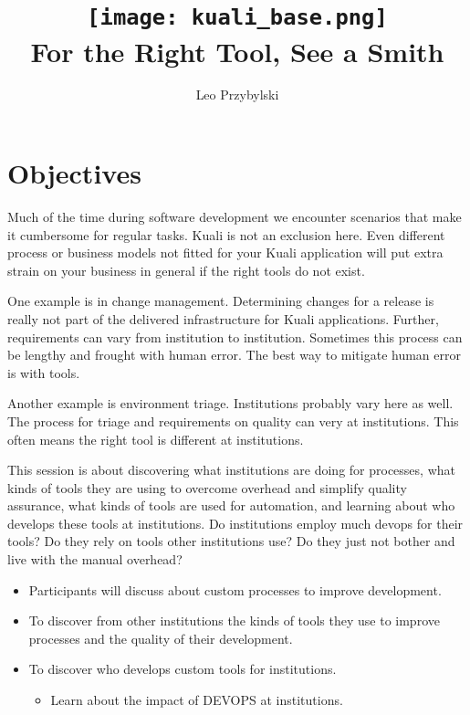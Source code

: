 \documentclass[12pt,notitlepage]{article}
\author{Leo Przybylski}
\title{\texttt{[image: kuali\_base.png]}\\For the Right Tool, See a Smith}
\date{}
\begin{document}
\maketitle
{}

\section{Objectives}

Much of the time during software development we encounter
  scenarios that make it cumbersome for regular tasks. Kuali is not an
exclusion here. Even different process or business models not fitted
for your Kuali application will put extra strain on your business in
general if the right tools do not exist. 

One example is in change
management. Determining changes for a release is really not part of
the delivered infrastructure for Kuali applications. Further, requirements can
vary from institution to institution. Sometimes this process can be
lengthy and frought with human error. The best way to mitigate human
error is with tools.

Another example is environment triage. Institutions probably vary here
as well. The process for triage and requirements on quality can very
at institutions. This often means the right tool is different at
institutions.

This session is about discovering what institutions are doing for
processes, what kinds of tools they are using to overcome overhead and 
simplify quality assurance, what kinds of tools are used for
automation,
 and learning about who develops these
tools at institutions. Do institutions employ much devops for their
tools? Do they rely on tools other institutions use? Do they just not
bother and live with the manual overhead?


\begin{itemize}
\item Participants will discuss about custom processes to improve
  development.
\item To discover from other institutions the kinds of tools they use
  to improve processes and the quality of their development.
\item To discover who develops custom tools for institutions.
  \begin{itemize}
    \item Learn about the impact of DEVOPS at institutions.
  \end{itemize}
\end{itemize}
\end{document}
